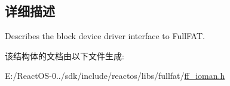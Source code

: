 \subsection{详细描述}
Describes the block device driver interface to Full\+F\+AT. 

该结构体的文档由以下文件生成\+:\begin{DoxyCompactItemize}
\item 
E\+:/\+React\+O\+S-\/0../sdk/include/reactos/libs/fullfat/\hyperlink{ff__ioman_8h}{ff\+\_\+ioman.\+h}\end{DoxyCompactItemize}
